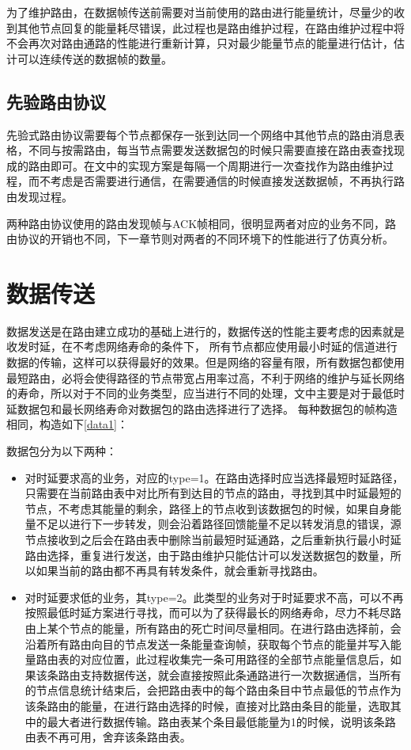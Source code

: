 \documentclass[a4paper,AutoFakeBold,oneside,12pt]{book}
\begin{document}
  为了维护路由，在数据帧传送前需要对当前使用的路由进行能量统计，尽量少的收到其他节点回复的能量耗尽错误，此过程也是路由维护过程，在路由维护过程中将不会再次对路由通路的性能进行重新计算，只对最少能量节点的能量进行估计，估计可以连续传送的数据帧的数量。
  \subsection{先验路由协议}
  先验式路由协议需要每个节点都保存一张到达同一个网络中其他节点的路由消息表格，不同与按需路由，每当节点需要发送数据包的时候只需要直接在路由表查找现成的路由即可。在文中的实现方案是每隔一个周期进行一次查找作为路由维护过程，而不考虑是否需要进行通信，在需要通信的时候直接发送数据帧，不再执行路由发现过程。
  
  两种路由协议使用的路由发现帧与ACK帧相同，很明显两者对应的业务不同，路由协议的开销也不同，下一章节则对两者的不同环境下的性能进行了仿真分析。
  \section{数据传送}
  数据发送是在路由建立成功的基础上进行的，数据传送的性能主要考虑的因素就是收发时延，在不考虑网络寿命的条件下， 所有节点都应使用最小时延的信道进行数据的传输，这样可以获得最好的效果。但是网络的容量有限，所有数据包都使用最短路由，必将会使得路径的节点带宽占用率过高，不利于网络的维护与延长网络的寿命，所以对于不同的业务类型，应当进行不同的处理，文中主要是对于最低时延数据包和最长网络寿命对数据包的路由选择进行了选择。
  每种数据包的帧构造相同，构造如下\ref{data1}：
  
  数据包分为以下两种：
  \begin{itemize}
  \item 对时延要求高的业务，对应的type=1。在路由选择时应当选择最短时延路径，只需要在当前路由表中对比所有到达目的节点的路由，寻找到其中时延最短的节点，不考虑其能量的剩余，路径上的节点收到该数据包的时候，如果自身能量不足以进行下一步转发，则会沿着路径回馈能量不足以转发消息的错误，源节点接收到之后会在路由表中删除当前最短时延通路，之后重新执行最小时延路由选择，重复进行发送，由于路由维护只能估计可以发送数据包的数量，所以如果当前的路由都不再具有转发条件，就会重新寻找路由。
  \item 对时延要求低的业务，其type=2。此类型的业务对于时延要求不高，可以不再按照最低时延方案进行寻找，而可以为了获得最长的网络寿命，尽力不耗尽路由上某个节点的能量，所有路由的死亡时间尽量相同。在进行路由选择前，会沿着所有路由向目的节点发送一条能量查询帧，获取每个节点的能量并写入能量路由表的对应位置，此过程收集完一条可用路径的全部节点能量信息后，如果该条路由支持数据传送，就会直接按照此条通路进行一次数据通信，当所有的节点信息统计结束后，会把路由表中的每个路由条目中节点最低的节点作为该条路由的能量，在进行路由选择的时候，直接对比路由条目的能量，选取其中的最大者进行数据传输。路由表某个条目最低能量为1的时候，说明该条路由表不再可用，舍弃该条路由表。
  \end{itemize}
  
\end{document}
